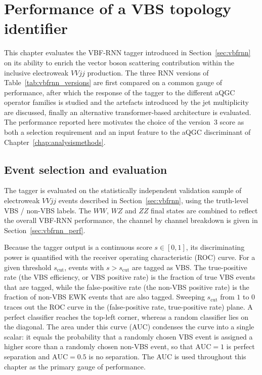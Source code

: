 \chapter{Performance of a VBS topology identifier}
\label{chap:vbfrnn_results}

This chapter evaluates the VBF-RNN tagger introduced in Section~\ref{sec:vbfrnn} on its ability to enrich the vector boson scattering contribution within the inclusive electroweak $VVjj$ production. The three RNN versions of Table~\ref{tab:vbfrnn_versions} are first compared on a common gauge of performance, after which the response of the tagger to the different aQGC operator families is studied and the artefacts introduced by the jet multiplicity are discussed, finally an alternative transformer-based architecture is evaluated. The performance reported here motivates the choice of the version~3 score as both a selection requirement and an input feature to the aQGC discriminant of Chapter~\ref{chap:analysismethods}.

\section{Event selection and evaluation}
\label{sec:vbfrnn_eval}

The tagger is evaluated on the statistically independent validation sample of electroweak $VVjj$ events described in Section~\ref{sec:vbfrnn}, using the truth-level VBS / non-VBS labels. The $WW$, $WZ$ and $ZZ$ final states are combined to reflect the overall VBF-RNN performance, the channel by channel breakdown is given in Section~\ref{sec:vbfrnn_perf}.

Because the tagger output is a continuous score $s\in[0,1]$, its discriminating power is quantified with the receiver operating characteristic (ROC) curve. For a given threshold $s_{\mathrm{cut}}$, events with $s>s_{\mathrm{cut}}$ are tagged as VBS. The true-positive rate (the VBS efficiency, or VBS positive rate) is the fraction of true VBS events that are tagged, while the false-positive rate (the non-VBS positive rate) is the fraction of non-VBS EWK events that are also tagged. Sweeping $s_{\mathrm{cut}}$ from $1$ to $0$ traces out the ROC curve in the (false-positive rate, true-positive rate) plane. A perfect classifier reaches the top-left corner, whereas a random classifier lies on the diagonal. The area under this curve (AUC) condenses the curve into a single scalar: it equals the probability that a randomly chosen VBS event is assigned a higher score than a randomly chosen non-VBS event, so that $\mathrm{AUC}=1$ is perfect separation and $\mathrm{AUC}=0.5$ is no separation. The AUC is used throughout this chapter as the primary gauge of performance.

